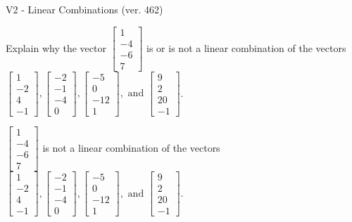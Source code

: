 \begin{exercise}
  \begin{exerciseTitle}V2 - Linear Combinations (ver. 462)\end{exerciseTitle}
  \begin{exerciseStatement}
    Explain why the vector \(\left[\begin{array}{c}
1 \\
-4 \\
-6 \\
7
\end{array}\right]\)  is or is not a linear 
	combination of the vectors \(\left[\begin{array}{c}
1 \\
-2 \\
4 \\
-1
\end{array}\right] , \left[\begin{array}{c}
-2 \\
-1 \\
-4 \\
0
\end{array}\right] , \left[\begin{array}{c}
-5 \\
0 \\
-12 \\
1
\end{array}\right] , \text{ and } \left[\begin{array}{c}
9 \\
2 \\
20 \\
-1
\end{array}\right]\).
	


  \end{exerciseStatement}
  \begin{exerciseAnswer}
   \(\left[\begin{array}{c}
1 \\
-4 \\
-6 \\
7
\end{array}\right]\) 
  	 is not  
	a linear combination of the vectors \(\left[\begin{array}{c}
1 \\
-2 \\
4 \\
-1
\end{array}\right] , \left[\begin{array}{c}
-2 \\
-1 \\
-4 \\
0
\end{array}\right] , \left[\begin{array}{c}
-5 \\
0 \\
-12 \\
1
\end{array}\right] , \text{ and } \left[\begin{array}{c}
9 \\
2 \\
20 \\
-1
\end{array}\right]\).


\end{exerciseAnswer}
\end{exercise}
